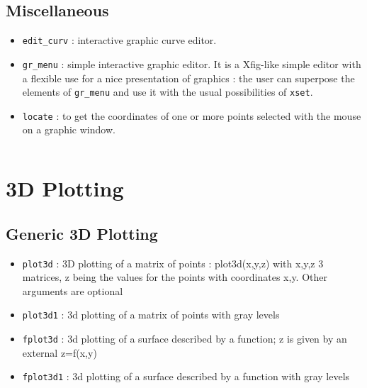 \subsection{Miscellaneous}
%
\begin{itemize}
	\item  \verb+edit_curv+ : interactive graphic curve editor.

	\item  \verb+gr_menu+ 	: simple interactive graphic editor. It
is a Xfig-like simple editor with a flexible use for a nice
presentation of graphics : the user can superpose the elements of
\verb+gr_menu+ and use it with the usual possibilities of {\tt xset}.

	\item  \verb+locate+ 	: to get the coordinates of one or more 
points selected with the mouse on a graphic window.

\end{itemize}
% 

\begin{verbatim}

\end{verbatim}




\section{3D Plotting}
\subsection{Generic 3D Plotting}
%
\begin{itemize}
	\item  \verb+plot3d+ : 3D plotting of a matrix of points : plot3d(x,y,z) with x,y,z 3 matrices, z being the values for the points with coordinates x,y. Other
arguments are optional
	\item   \verb+plot3d1+ : 3d plotting	of a matrix of points with gray levels
	\item   \verb+fplot3d+ : 3d plotting	of a surface described by a function; z is given by an external z=f(x,y)
	\item   \verb+fplot3d1+ : 3d	plotting of a surface described	by a function with gray	levels
\end{itemize}
%
 
